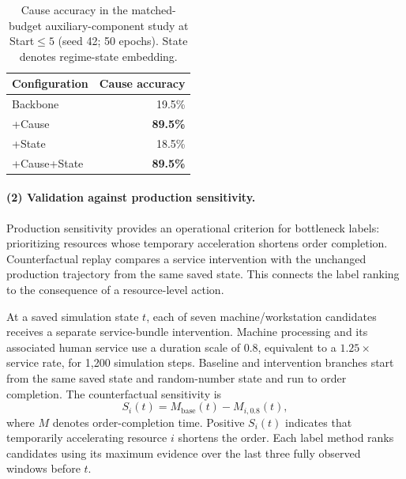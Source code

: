 \documentclass[a4paper,fleqn]{cas-dc}
\begin{document}
\begin{table}[t]
\centering
\caption{Cause accuracy in the matched-budget auxiliary-component study at Start$\leq5$ (seed 42; 50 epochs). State denotes regime-state embedding.}
\label{tab:matched-cause-state}
\scriptsize
\setlength{\tabcolsep}{3.5pt}
\renewcommand{\arraystretch}{1.08}
\begin{tabular*}{\columnwidth}{@{\extracolsep{\fill}}lr@{}}
\toprule
Configuration & Cause accuracy \\
\midrule
Backbone & 19.5\% \\
+Cause & \textbf{89.5\%} \\
+State & 18.5\% \\
+Cause+State & \textbf{89.5\%} \\
\bottomrule
\end{tabular*}
\end{table}

\paragraph*{(2) Validation against production sensitivity.}
Production sensitivity provides an operational criterion for bottleneck labels: prioritizing resources whose temporary acceleration shortens order completion. Counterfactual replay compares a service intervention with the unchanged production trajectory from the same saved state. This connects the label ranking to the consequence of a resource-level action.


At a saved simulation state $t$, each of seven machine/workstation candidates receives a separate service-bundle intervention. Machine processing and its associated human service use a duration scale of $0.8$, equivalent to a $1.25\times$ service rate, for 1,200 simulation steps. Baseline and intervention branches start from the same saved state and random-number state and run to order completion. The counterfactual sensitivity is
\begin{equation}
S_i(t)=M_{\mathrm{base}}(t)-M_{i,0.8}(t),
\end{equation}
where $M$ denotes order-completion time. Positive $S_i(t)$ indicates that temporarily accelerating resource $i$ shortens the order. Each label method ranks candidates using its maximum evidence over the last three fully observed windows before $t$.
\end{document}
